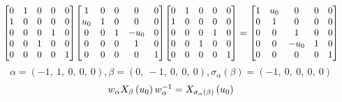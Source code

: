 \documentclass[11pt]{article}
\theoremstyle{definition}
\begin{document}
\[
\scaletoalign{\textwidth}{{\left[\begin{matrix}0 & 1 & 0 & 0 & 0\\1 & 0 & 0 & 0 & 0\\0 & 0 & 0 & 1 & 0\\0 & 0 & 1 & 0 & 0\\0 & 0 & 0 & 0 & 1\end{matrix}\right]} {\left[\begin{matrix}1 & 0 & 0 & 0 & 0\\u_{0} & 1 & 0 & 0 & 0\\0 & 0 & 1 & - u_{0} & 0\\0 & 0 & 0 & 1 & 0\\0 & 0 & 0 & 0 & 1\end{matrix}\right]} {\left[\begin{matrix}0 & 1 & 0 & 0 & 0\\1 & 0 & 0 & 0 & 0\\0 & 0 & 0 & 1 & 0\\0 & 0 & 1 & 0 & 0\\0 & 0 & 0 & 0 & 1\end{matrix}\right]} = {\left[\begin{matrix}1 & u_{0} & 0 & 0 & 0\\0 & 1 & 0 & 0 & 0\\0 & 0 & 1 & 0 & 0\\0 & 0 & - u_{0} & 1 & 0\\0 & 0 & 0 & 0 & 1\end{matrix}\right]}}
\]
\[
\alpha = \left( -1, \  1, \  0, \  0, \  0\right), \beta = \left( 0, \  -1, \  0, \  0, \  0\right), \sigma_{\alpha}(\beta) = \left( -1, \  0, \  0, \  0, \  0\right)
\]
\[
\scaletoalign{\textwidth}{w_{\alpha} X_{\beta}\left(u_{0}\right) w_{\alpha}^{-1} = X_{\sigma_{\alpha}\left(\beta\right)}\left(u_{0}\right)}
\]
\end{document}
